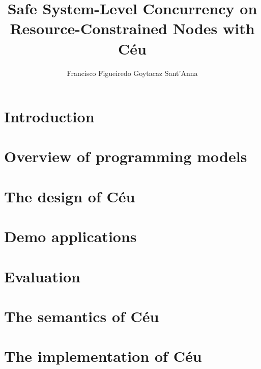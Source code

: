 \documentclass[phd,twoside,british]{ThesisPUC_uk}
\author{Francisco Figueiredo Goytacaz Sant'Anna}
\title{Safe System-Level Concurrency on Resource-Constrained Nodes with C\'eu}
\newcommand{\1}{\;}
\newcommand{\2}{\;\;}
\newcommand{\3}{\;\;\;}
\newcommand{\5}{\;\;\;\;\;}
\begin{document}


\chapter{Introduction}
    \label{sec.intro}
    

\chapter{Overview of programming models}
    \label{sec.models}
    

\chapter{The design of C\'eu}
    \label{sec.ceu}
    

\chapter{Demo applications}
    \label{sec.demos}
    

\chapter{Evaluation}
    \label{sec.eval}
    

\chapter{The semantics of C\'eu}
    \label{sec.formal}
    

\chapter{The implementation of C\'eu}
    \label{sec.impl}
    

\end{document}
